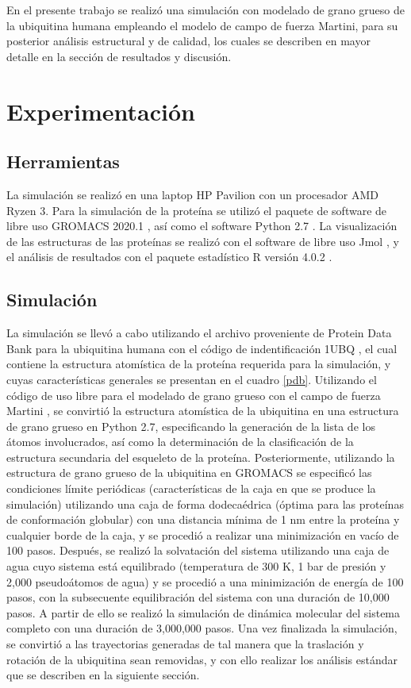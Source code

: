 \documentclass[3pt,twocolumn]{elsarticle}
\begin{document}
En el presente trabajo se realizó una simulación con modelado de grano grueso de la ubiquitina humana empleando el modelo de campo de fuerza Martini, para su posterior análisis estructural y de calidad, los cuales se describen en mayor detalle en la sección de resultados y discusión.

\section{Experimentación}
\subsection{Herramientas}
La simulación se realizó en una laptop HP Pavilion con un procesador AMD Ryzen 3. Para la simulación de la proteína se utilizó el paquete de software de libre uso GROMACS 2020.1 \cite{gromacs}, así como el software Python 2.7 \cite{python}. La visualización de las estructuras de las proteínas se realizó con el software de libre uso Jmol \cite{jmol}, y el análisis de resultados con el paquete estadístico R versión 4.0.2 \cite{R}.
\subsection{Simulación}
La simulación se llevó a cabo utilizando el archivo proveniente de Protein Data Bank para la ubiquitina humana con el código de indentificación 1UBQ \cite{proteina}, el cual contiene la estructura atomística de la proteína requerida para la simulación, y cuyas características generales se presentan en el cuadro \ref{pdb}. Utilizando el código de uso libre para el modelado de grano grueso con el campo de fuerza Martini \cite{martinize}, se convirtió la estructura atomística de la ubiquitina en una estructura de grano grueso en Python 2.7, especificando la generación de la lista de los átomos involucrados, así como la determinación de la clasificación de la estructura secundaria del esqueleto de la proteína. Posteriormente, utilizando la estructura de grano grueso de la ubiquitina en GROMACS se especificó las condiciones límite periódicas (características de la caja en que se produce la simulación) utilizando una caja de forma dodecaédrica (óptima para las proteínas de conformación globular) con una distancia mínima de 1 nm entre la proteína y cualquier borde de la caja, y se procedió a realizar una minimización en vacío de 100 pasos. Después, se realizó la solvatación del sistema utilizando una caja de agua cuyo sistema está equilibrado (temperatura de 300 K, 1 bar de presión y 2,000 pseudoátomos de agua) y se procedió a una minimización de energía de 100 pasos, con la subsecuente equilibración del sistema con una duración de 10,000 pasos. A partir de ello se realizó la simulación de dinámica molecular del sistema completo con una duración de 3,000,000 pasos. Una vez finalizada la simulación, se convirtió a las trayectorias generadas de tal manera que la traslación y rotación de la ubiquitina sean removidas, y con ello realizar los análisis estándar que se describen en la siguiente sección.  
\end{document}
